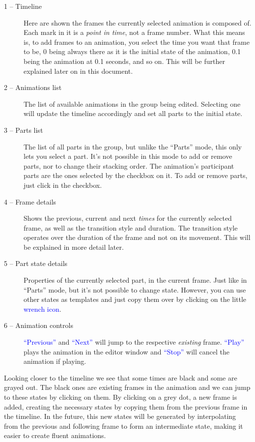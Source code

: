 \documentclass[a4paper]{profusion}
\newcommand{\GUIIcon}[1]{\textcolor{blue}{#1}}    %
\begin{document}
\begin{description}
\item[1 -- Timeline] Here are shown the frames the currently selected
  animation is composed of. Each mark in it is a \emph{point in time},
  not a frame number. What this means is, to add frames to an
  animation, you select the time you want that frame to be, 0 being
  always there as it is the initial state of the animation, 0.1 being
  the animation at 0.1 seconds, and so on.  This will be further
  explained later on in this document.
\item[2 -- Animations list] The list of available animations in the
  group being edited. Selecting one will update the timeline
  accordingly and set all parts to the initial state.
\item[3 -- Parts list] The list of all parts in the group, but unlike
  the ``Parts'' mode, this only lets you select a part. It's not
  possible in this mode to add or remove parts, nor to change their
  stacking order. The animation's participant parts are the ones
  selected by the checkbox on it. To add or remove parts, just
  click in the checkbox.
\item[4 -- Frame details] Shows the previous, current and next
  \emph{times} for the currently selected frame, as well as the
  transition style and duration. The transition style operates over
  the duration of the frame and not on its movement. This will be
  explained in more detail later.
\item[5 -- Part state details] Properties of the currently selected
  part, in the current frame. Just like in ``Parts'' mode, but it's
  not possible to change state. However, you can use other states as
  templates and just copy them over by clicking on the little
  \GUIIcon{wrench icon}.
\item[6 -- Animation controls] \GUIIcon{``Previous''} and
  \GUIIcon{``Next''} will jump to the respective \emph{existing}
  frame. \GUIIcon{``Play''} plays the animation in the editor window
  and \GUIIcon{``Stop''} will cancel the animation if playing.
\end{description}

Looking closer to the timeline we see that some times are black and
some are grayed out. The black ones are existing frames in the
animation and we can jump to these states by clicking on them. By
clicking on a grey dot, a new frame is added, creating the necessary
states by copying them from the previous frame in the timeline. In the
future, this new states will be generated by interpolating from the
previous and following frame to form an intermediate state, making it
easier to create fluent animations.
\end{document}

